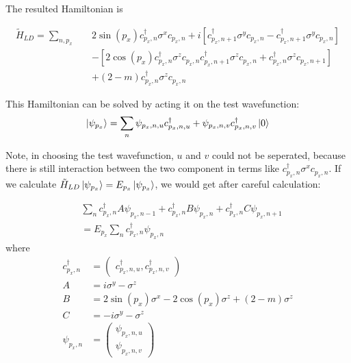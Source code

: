 \documentclass{article}
\begin{document}
The resulted Hamiltonian is 

\begin{align}
    \tilde H_{LD} = \sum_{n,p_x}\quad &
    2\sin(p_x) c^\dagger_{p_x,n}\sigma^x c_{p_x,n}
    +i \left[ c^\dagger_{p_x,n+1}\sigma^y c_{p_x,n} - 
        c^\dagger_{p_x,n+1}\sigma^y c_{p_x,n}\right]
    \nonumber\\
    &- \left[ 2\cos(p_x) c^\dagger_{p_x,n}\sigma^z c_{p_x,n}
        c^\dagger_{p_x,n+1}\sigma^z c_{p_x,n}
        + c^\dagger_{p_x,n}\sigma^z c_{p_x,n+1}
    \right]
    \nonumber\\
    &+ (2-m) c^\dagger_{p_x,n}\sigma^z c_{p_x,n}
\end{align}

This Hamiltonian can be solved by acting it on the test wavefunction:
\begin{equation}
    \ket{\psi_{p_x}} = \sum_n \psi_{p_x,n,u} c^\dagger_{p_x,n,u} +
                        \psi_{p_x,n,v} c^\dagger_{p_x,n,v} \ket{0}
\end{equation}

Note, in choosing the test wavefunction, $u$ and $v$ could not be
seperated, because there is still interaction between the two
component in terms like $c^\dagger_{p_x,n}\sigma^x c_{p_x,n}$.
If we calculate $\tilde H_{LD}\ket{\psi_{p_x}} = E_{p_x}
\ket{\psi_{p_x}}$, we would get after careful calculation:

\begin{align}
    & \sum_n
    c^\dagger_{p_x,n} A   \psi_{p_x,n-1}
    + c^\dagger_{p_x,n} B \psi_{p_x,n} 
    + c^\dagger_{p_x,n} C \psi_{p_x,n+1}
    \nonumber\\
    &= E_{p_x} \sum_n c^\dagger_{p_x,n}\psi_{p_x,n}
\end{align}
where
\begin{align}
    c^\dagger_{p_x,n} &= \begin{pmatrix}
        c^\dagger_{p_x,n,u},  c^\dagger_{p_x,n,v}
    \end{pmatrix} \\
    A &= i\sigma^y - \sigma^z \\
    B &= 2\sin(p_x)\sigma^x - 2\cos(p_x)\sigma^z + (2-m)\sigma^z \\
    C &= -i\sigma^y - \sigma^z \\
    \psi_{p_x,n} &= \begin{pmatrix}
        \psi_{p_x,n,u} \\ \psi_{p_x,n,v}
    \end{pmatrix}
\end{align}
\end{document}
